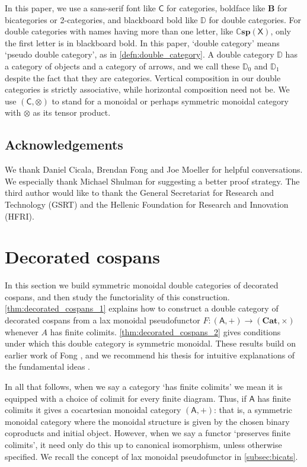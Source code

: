 \documentclass[reqno]{amsart}
\let\maps\colon
\theoremstyle{definition}
\theoremstyle{remark}
\newcommand{\A}{\mathsf{A}}
\newcommand{\C}{\mathsf{C}}
\newcommand{\X}{\mathsf{X}}
\newcommand{\bicat}{\mathbf}
\newcommand{\Cat}{\bicat{Cat}}
\newcommand{\double}[1]{\mathbf{\mathbb #1}}
\newcommand{\lCsp}{\double{Csp}}
\newcommand{\lD}{\double{D}}
\begin{document}
In this paper, we use a sans-serif font like $\C$ for categories, boldface like $\mathbf{B}$ for bicategories or 2-categories, and blackboard bold like $\lD$ for double categories. For double categories with names having more than one letter, like $\lCsp(\X)$, only the first letter is in blackboard bold. In this paper, `double category' means `pseudo double category', as in \cref{defn:double_category}. A double category $\lD$ has a category of objects and a category of arrows, and we call these $\lD_0$ and $\lD_1$ despite the fact that they are categories. Vertical composition in our double categories is strictly associative, while horizontal composition need not be.  We use $(\C,\otimes)$ to stand for a monoidal or perhaps symmetric monoidal category with $\otimes$ as its tensor product.

\subsection*{Acknowledgements}

We thank Daniel Cicala, Brendan Fong and Joe Moeller for helpful conversations.  We especially thank Michael Shulman for suggesting a better proof strategy.  The third author would like to thank the General Secretariat for Research  and Technology (GSRT) and the Hellenic Foundation for Research and Innovation (HFRI).

\section{Decorated cospans}\label{DecCospansDoubleCat}

In this section we build symmetric monoidal double categories of decorated cospans, and then study the functoriality of this construction.   \cref{thm:decorated_cospans_1} explains how to construct a double category of decorated cospans from a lax monoidal pseudofunctor $F \maps (\A,+) \to (\Cat, \times)$ whenever $A$ has finite colimits.  \cref{thm:decorated_cospans_2} gives conditions under which this double category is symmetric monoidal.   These results build on earlier work of Fong \cite{Fong}, and we recommend his thesis for intuitive explanations of the fundamental ideas \cite{FongThesis}.

In all that follows, when we say a category `has finite colimits' we mean it is equipped with a choice of colimit for every finite diagram.   Thus, if $\A$ has finite colimits it gives a cocartesian monoidal category $(\A,+)$: that is, a symmetric monoidal category where the monoidal structure is given by the chosen binary coproducts and initial object.   However, when we say a functor `preserves finite colimits', it need only do this up to canonical isomorphism, unless otherwise specified.   We recall the concept of lax monoidal pseudofunctor in \cref{subsec:bicats}.
\end{document}

